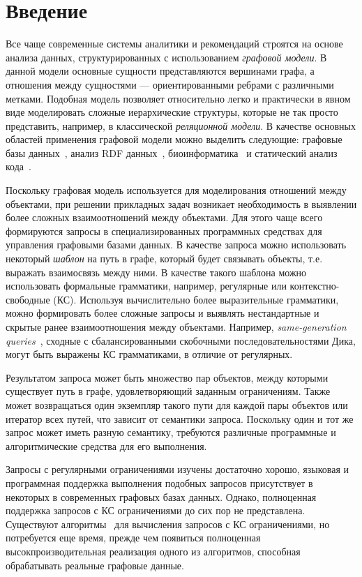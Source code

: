 \section*{Введение}

Все чаще современные системы аналитики и рекомендаций строятся на основе анализа данных, структурированных с использованием \textit{графовой модели}. В данной модели основные сущности представляются вершинами графа, а отношения между сущностями --- ориентированными ребрами с различными метками. Подобная модель позволяет относительно легко и практически в явном виде моделировать сложные иерархические структуры, которые не так просто представить, например, в классической \textit{реляционной модели}. В качестве основных областей применения графовой модели можно выделить следующие: графовые базы данных~\cite{article:querying_graph_databases}, анализ RDF данных~\cite{article:cfpq_and_rdf_analysis}, биоинформатика~\cite{article:rna_prediction} и статический анализ кода~\cite{article:dyck_cfl_code_analysis}.

Поскольку графовая модель используется для моделирования отношений между объектами, при решении прикладных задач возникает необходимость в выявлении более сложных взаимоотношений между объектами. Для этого чаще всего формируются запросы в специализированных программных средствах для управления графовыми базами данных. В качестве запроса можно использовать некоторый \textit{шаблон} на путь в графе, который будет связывать объекты, т.е. выражать взаимосвязь между ними. В качестве такого шаблона можно использовать формальные грамматики, например, регулярные или контекстно-свободные (КС). Используя вычислительно более выразительные грамматики, можно формировать более сложные запросы и выявлять нестандартные и скрытые ранее взаимоотношения между объектами. Например, \textit{same-generation queries}~\cite{inbook:databases_intro}, сходные с сбалансированными скобочными последовательностями Дика, могут быть выражены КС грамматиками, в отличие от регулярных.

Результатом запроса может быть множество пар объектов, между которыми существует путь в графе, удовлетворяющий заданным ограничениям. Также может возвращаться один экземпляр такого пути для каждой пары объектов или итератор всех путей, что зависит от семантики запроса. Поскольку один и тот же запрос может иметь разную семантику, требуются различные программные и алгоритмические средства для его выполнения.  

Запросы с регулярными ограничениями изучены достаточно хорошо, языковая и программная поддержка выполнения подобных запросов присутствует в некоторых в современных графовых базах данных. Однако, полноценная поддержка запросов с КС ограничениями до сих пор не представлена. Существуют алгоритмы~\cite{article:cfpq_and_rdf_analysis, article:hellings_cfpq, inproceedings:matrix_cfpq, inbook:kronecker_cfpq_adbis, article:cfpq_go_for_rdf} для вычисления запросов с КС ограничениями, но потребуется еще время, прежде чем появиться полноценная высокпроизводительная реализация одного из алгоритмов, способная обрабатывать реальные графовые данные.

